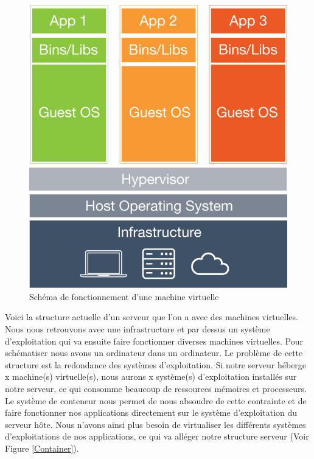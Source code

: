       \begin{figure}
        \begin{center}
          \includegraphics[scale=0.2]{images/virtualMachine.png}
        \end{center}
        \caption{Schéma de fonctionnement d'une machine virtuelle}
        \label{Virtual Machine}
      \end{figure}

      Voici la structure actuelle d’un serveur que l’on a avec des machines virtuelles. Nous nous retrouvons avec une infrastructure et par dessus un système d’exploitation qui va ensuite faire fonctionner diverses machines virtuelles. Pour schématiser nous avons un ordinateur dans un ordinateur. Le problème de cette structure est la redondance des systèmes d’exploitation. Si notre serveur héberge x machine(s) virtuelle(s), nous aurons x système(s) d’exploitation installés sur notre serveur, ce qui consomme beaucoup de ressources mémoires et processeurs.\\

      Le système de conteneur nous permet de nous absoudre de cette contrainte et de faire fonctionner nos applications directement sur le système d’exploitation du serveur hôte. Nous n'avons ainsi plus besoin de virtualiser les différents systèmes d’exploitations de nos applications, ce qui va alléger notre structure serveur (Voir Figure \ref{Container}).\\

